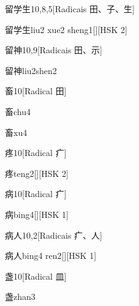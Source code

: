 \begin{entry}{留学生}{10,8,5}[Radicais ⽥、⼦、⽣]
  \begin{phonetics}{留学生}{liu2 xue2 sheng1}[][HSK 2]
  \end{phonetics}
\end{entry}

\begin{entry}{留神}{10,9}[Radicais ⽥、⽰]
  \begin{phonetics}{留神}{liu2shen2}
  \end{phonetics}
\end{entry}

\begin{entry}{畜}{10}[Radical ⽥]
  \begin{phonetics}{畜}{chu4}
  \end{phonetics}
  \begin{phonetics}{畜}{xu4}
  \end{phonetics}
\end{entry}

\begin{entry}{疼}{10}[Radical ⽧]
  \begin{phonetics}{疼}{teng2}[][HSK 2]
  \end{phonetics}
\end{entry}

\begin{entry}{病}{10}[Radical ⽧]
  \begin{phonetics}{病}{bing4}[][HSK 1]
  \end{phonetics}
\end{entry}

\begin{entry}{病人}{10,2}[Radicais ⽧、⼈]
  \begin{phonetics}{病人}{bing4 ren2}[][HSK 1]
  \end{phonetics}
\end{entry}

\begin{entry}{盏}{10}[Radical ⽫]
  \begin{phonetics}{盏}{zhan3}
  \end{phonetics}
\end{entry}

